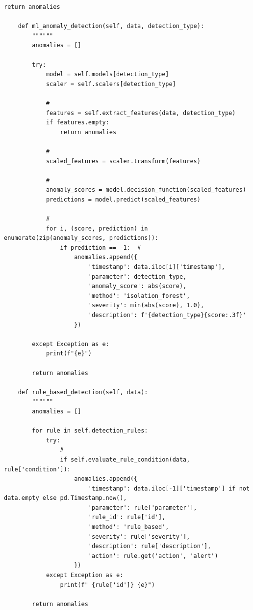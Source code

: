 \begin{lstlisting}[style=python]
        return anomalies
    
    def ml_anomaly_detection(self, data, detection_type):
        """"""
        anomalies = []
        
        try:
            model = self.models[detection_type]
            scaler = self.scalers[detection_type]
            
            # 
            features = self.extract_features(data, detection_type)
            if features.empty:
                return anomalies
            
            # 
            scaled_features = scaler.transform(features)
            
            # 
            anomaly_scores = model.decision_function(scaled_features)
            predictions = model.predict(scaled_features)
            
            # 
            for i, (score, prediction) in enumerate(zip(anomaly_scores, predictions)):
                if prediction == -1:  # 
                    anomalies.append({
                        'timestamp': data.iloc[i]['timestamp'],
                        'parameter': detection_type,
                        'anomaly_score': abs(score),
                        'method': 'isolation_forest',
                        'severity': min(abs(score), 1.0),
                        'description': f'{detection_type}{score:.3f}'
                    })
        
        except Exception as e:
            print(f"{e}")
        
        return anomalies
    
    def rule_based_detection(self, data):
        """"""
        anomalies = []
        
        for rule in self.detection_rules:
            try:
                # 
                if self.evaluate_rule_condition(data, rule['condition']):
                    anomalies.append({
                        'timestamp': data.iloc[-1]['timestamp'] if not data.empty else pd.Timestamp.now(),
                        'parameter': rule['parameter'],
                        'rule_id': rule['id'],
                        'method': 'rule_based',
                        'severity': rule['severity'],
                        'description': rule['description'],
                        'action': rule.get('action', 'alert')
                    })
            except Exception as e:
                print(f" {rule['id']} {e}")
        
        return anomalies
    

\end{lstlisting}
